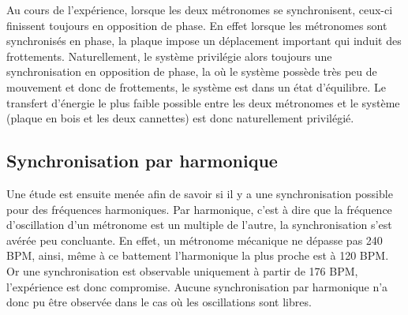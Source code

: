 \documentclass[a4paper,11pt]{report}
\begin{document}
Au cours de l'expérience, lorsque les deux métronomes se synchronisent, ceux-ci finissent toujours en opposition de phase. En effet lorsque les métronomes sont synchronisés en phase, la plaque impose un  déplacement important qui induit des frottements. Naturellement, le système privilégie alors toujours une synchronisation en opposition de phase, la où le système possède très peu de mouvement et donc de frottements, le système est dans un état d'équilibre. Le transfert d'énergie le plus faible possible entre les deux métronomes et le système (plaque en bois et les deux cannettes) est donc naturellement privilégié.	

\subsection{Synchronisation par harmonique}
Une étude est ensuite menée afin de savoir si il y a une synchronisation possible pour des fréquences harmoniques. Par harmonique, c'est à dire que la fréquence d'oscillation d'un métronome est un multiple de l'autre, la synchronisation s'est avérée peu concluante. En effet, un métronome mécanique ne dépasse pas 240 BPM, ainsi, même à ce battement l'harmonique la plus proche est à 120 BPM. Or une synchronisation est observable uniquement à partir de 176 BPM, l'expérience est donc compromise. Aucune synchronisation par harmonique n'a donc pu être observée dans le cas où les oscillations sont libres.
\end{document}
